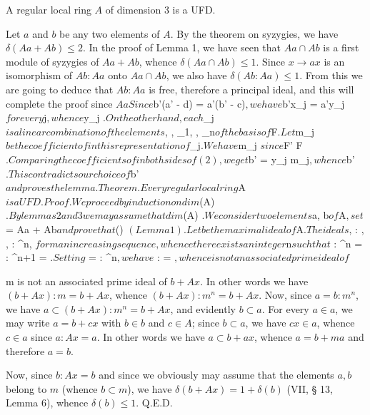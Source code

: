 A regular local ring $A$ of dimension 3 is a UFD.

Let $a$ and $b$ be any two elements of $A$. By the theorem on syzygies, we have $\delta(Aa + Ab) \leq 2$. In the proof of Lemma 1, we have seen that $Aa \cap Ab$ is a first module of syzygies of $Aa + Ab$, whence $\delta(Aa \cap Ab) \leq 1$. Since $x \rightarrow ax$ is an isomorphism of $Ab:Aa$ onto $Aa \cap Ab$, we also have $\delta(Ab:Aa) \leq 1$. From this we are going to deduce that $Ab:Aa$ is free, therefore a principal ideal, and this will complete the proof since $Aa

Since $b'(a' \gamma - d\beta) = a'(b' \gamma - c\beta)$, we have $b'x_j = a'y_j$ for every $j$, whence $y_j \in {}$. On the other hand, each $\alpha_j$ is a linear combination of the elements $\beta, \gamma, \gamma_1, \cdots, \gamma_n$ of the basis of $F$. Let $m_j$ be the coefficient of $\gamma$ in this representation of $\alpha_j$. We have $m_j \in {}$ since $F' \subset {}F$. Comparing the coefficients of $\gamma$ in both sides of (2), we get $b' = \sum y_j m_j$, whence $b' \in {}$. This contradicts our choice of $b'$ and proves the lemma.

Theorem. Every regular local ring $A$ is a UFD.

Proof. We proceed by induction on dim $(A)$. By lemmas 2 and 3 we may assume that dim $(A) $. We consider two elements $a, b$ of $A$, set $ = Aa + Ab$ and prove that $\delta() $ (Lemma 1). Let $$ be the maximal ideal of $A$. The ideals $,  : , \cdots,  : ^n, \cdots$ form an increasing sequence, whence there exists an integer $n$ such that $ : ^n =  : ^{n+1} = \cdots$. Setting $ =  : ^n$, we have $ :  = $, whence $$ is not an associated prime ideal of $\mathfrak

m is not an associated prime ideal of $b + Ax$. In other words we have $(b + Ax):m = b + Ax$, whence $(b + Ax):m^n = b + Ax$. Now, since $a = b:m^n$, we have $a \subset (b + Ax):m^n = b + Ax$, and evidently $b \subset a$. For every $a \in a$, we may write $a = b + cx$ with $b \in b$ and $c \in A$; since $b \subset a$, we have $cx \in a$, whence $c \in a$ since $a:Ax = a$. In other words we have $a \subset b + ax$, whence $a = b + ma$ and therefore $a = b$.

Now, since $b:Ax = b$ and since we obviously may assume that the elements $a, b$ belong to $m$ (whence $b \subset m$), we have $\delta(b + Ax) = 1 + \delta(b)$ (VII, § 13, Lemma 6), whence $\delta(b) \leq 1$. Q.E.D.